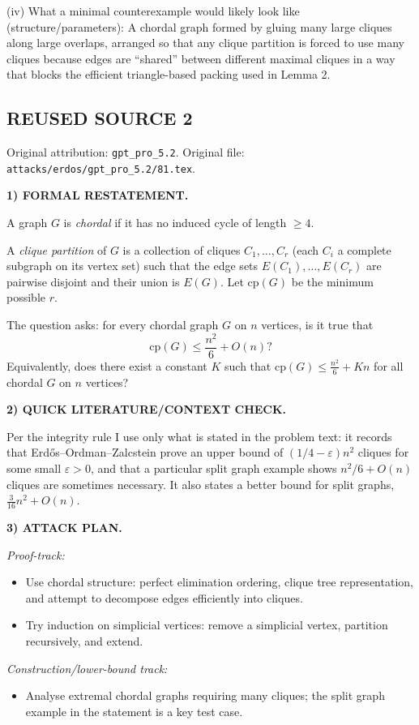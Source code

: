 (iv) What a minimal counterexample would likely look like (structure/parameters):
A chordal graph formed by gluing many large cliques along large overlaps, arranged so that any clique partition is forced to use many cliques because edges are ``shared'' between different maximal cliques in a way that blocks the efficient triangle-based packing used in Lemma 2.



\subsection*{REUSED SOURCE 2}
Original attribution: \texttt{gpt\_pro\_5.2}.
Original file: \texttt{attacks/erdos/gpt\_pro\_5.2/81.tex}.


\noindent\textbf{1) FORMAL RESTATEMENT.}

A graph $G$ is \emph{chordal} if it has no induced cycle of length $\ge 4$.

A \emph{clique partition} of $G$ is a collection of cliques $C_1,\dots,C_r$ (each $C_i$ a complete subgraph on its vertex set) such that the edge sets $E(C_1),\dots,E(C_r)$ are pairwise disjoint and their union is $E(G)$.
Let $\mathrm{cp}(G)$ be the minimum possible $r$.

The question asks: for every chordal graph $G$ on $n$ vertices, is it true that
\[
\mathrm{cp}(G) \le \frac{n^2}{6}+O(n)?
\]
Equivalently, does there exist a constant $K$ such that $\mathrm{cp}(G)\le \frac{n^2}{6}+Kn$ for all chordal $G$ on $n$ vertices?

\medskip
\noindent\textbf{2) QUICK LITERATURE/CONTEXT CHECK.}

Per the integrity rule I use only what is stated in the problem text: it records that Erd\H{o}s--Ordman--Zalcstein prove an upper bound of $(1/4-\varepsilon)n^2$ cliques for some small $\varepsilon>0$, and that a particular split graph example shows $n^2/6+O(n)$ cliques are sometimes necessary. It also states a better bound for split graphs, $\frac{3}{16}n^2+O(n)$.

\medskip
\noindent\textbf{3) ATTACK PLAN.}

\emph{Proof-track:}
\begin{itemize}
\item Use chordal structure: perfect elimination ordering, clique tree representation, and attempt to decompose edges efficiently into cliques.
\item Try induction on simplicial vertices: remove a simplicial vertex, partition recursively, and extend.
\end{itemize}
\emph{Construction/lower-bound track:}
\begin{itemize}
\item Analyse extremal chordal graphs requiring many cliques; the split graph example in the statement is a key test case.
\end{itemize}

